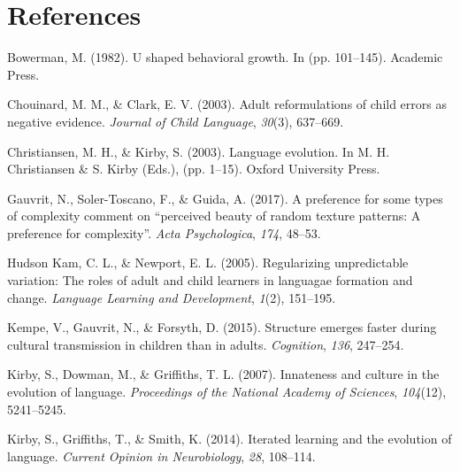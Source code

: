 \documentclass[10pt, letterpaper]{article}
\begin{document}
\vspace{1em}

\section{References}\label{references}

\setlength{\parindent}{-0.1in} \setlength{\leftskip}{0.125in}

\noindent

\hypertarget{refs}{}
\hypertarget{ref-bowerman-1982}{}
Bowerman, M. (1982). U shaped behavioral growth. In (pp. 101--145).
Academic Press.

\hypertarget{ref-chouinard-2003}{}
Chouinard, M. M., \& Clark, E. V. (2003). Adult reformulations of child
errors as negative evidence. \emph{Journal of Child Language},
\emph{30}(3), 637--669.

\hypertarget{ref-christiansen-2003}{}
Christiansen, M. H., \& Kirby, S. (2003). Language evolution. In M. H.
Christiansen \& S. Kirby (Eds.), (pp. 1--15). Oxford University Press.

\hypertarget{ref-gauvrit-2017}{}
Gauvrit, N., Soler-Toscano, F., \& Guida, A. (2017). A preference for
some types of complexity comment on ``perceived beauty of random texture
patterns: A preference for complexity''. \emph{Acta Psychologica},
\emph{174}, 48--53.

\hypertarget{ref-hudsonkam-2005}{}
Hudson Kam, C. L., \& Newport, E. L. (2005). Regularizing unpredictable
variation: The roles of adult and child learners in languagae formation
and change. \emph{Language Learning and Development}, \emph{1}(2),
151--195.

\hypertarget{ref-kempe-2015}{}
Kempe, V., Gauvrit, N., \& Forsyth, D. (2015). Structure emerges faster
during cultural transmission in children than in adults.
\emph{Cognition}, \emph{136}, 247--254.

\hypertarget{ref-kirby-2007}{}
Kirby, S., Dowman, M., \& Griffiths, T. L. (2007). Innateness and
culture in the evolution of language. \emph{Proceedings of the National
Academy of Sciences}, \emph{104}(12), 5241--5245.

\hypertarget{ref-kirby-2014}{}
Kirby, S., Griffiths, T., \& Smith, K. (2014). Iterated learning and the
evolution of language. \emph{Current Opinion in Neurobiology},
\emph{28}, 108--114.
\end{document}
